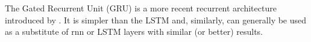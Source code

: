 

The Gated Recurrent Unit (GRU) is a more recent recurrent
architecture introduced by \textcite{cho2014learning}. It is
simpler than the LSTM and, similarly, can generally be used
as a substitute of \gls{rnn} or LSTM layers with similar (or
better) results.
